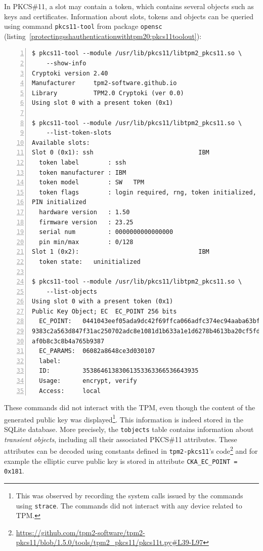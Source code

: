 In PKCS\#11, a slot may contain a token, which contains several objects
such as keys and certificates. Information about slots, tokens and
objects can be queried using command
\texttt{pkcs11-tool} from package
\texttt{opensc}
(listing~\ref{protectingsshauthenticationwithtpm20:pkcs11toolout}):

\begin{lstlisting}[numbers=left, caption={Output of \texttt{pkcs11-tool} on a system using a software TPM}, label=protectingsshauthenticationwithtpm20:pkcs11toolout]
$ pkcs11-tool --module /usr/lib/pkcs11/libtpm2_pkcs11.so \
    --show-info
Cryptoki version 2.40
Manufacturer     tpm2-software.github.io
Library          TPM2.0 Cryptoki (ver 0.0)
Using slot 0 with a present token (0x1)

$ pkcs11-tool --module /usr/lib/pkcs11/libtpm2_pkcs11.so \
    --list-token-slots
Available slots:
Slot 0 (0x1): ssh                             IBM
  token label        : ssh
  token manufacturer : IBM
  token model        : SW   TPM
  token flags        : login required, rng, token initialized,
PIN initialized
  hardware version   : 1.50
  firmware version   : 23.25
  serial num         : 0000000000000000
  pin min/max        : 0/128
Slot 1 (0x2):                                 IBM
  token state:   uninitialized

$ pkcs11-tool --module /usr/lib/pkcs11/libtpm2_pkcs11.so \
    --list-objects
Using slot 0 with a present token (0x1)
Public Key Object; EC  EC_POINT 256 bits
  EC_POINT:   0441043eef05ada9dc42f69ffca066adfc374ec94aaba63bfa
9383c2a563d847f31ac250702adc8e1081d1b633a1e1d6278b4613ba20cf5fd8
af0b8c3c8b4a765b9387
  EC_PARAMS:  06082a8648ce3d030107
  label:
  ID:         35386461383061353363366536643935
  Usage:      encrypt, verify
  Access:     local
\end{lstlisting}

These commands did not interact with the TPM, even though the content of
the generated public key was displayed\footnote{This was observed by
  recording the system calls issued by the commands using
  \texttt{strace}. The commands did not interact with
  any device related to TPM.}. This information is indeed stored in the
SQLite database. More precisely, the \texttt{tobjects}
table contains information about \emph{transient objects}, including all
their associated PKCS\#11 attributes. These attributes can be decoded
using constants defined in \texttt{tpm2-pkcs11}'s
code\footnote{\url{https://github.com/tpm2-software/tpm2-pkcs11/blob/1.5.0/tools/tpm2_pkcs11/pkcs11t.py\#L39-L97}}
and for example the elliptic curve public key is stored in attribute
\texttt{CKA\_EC\_POINT = 0x181}.

